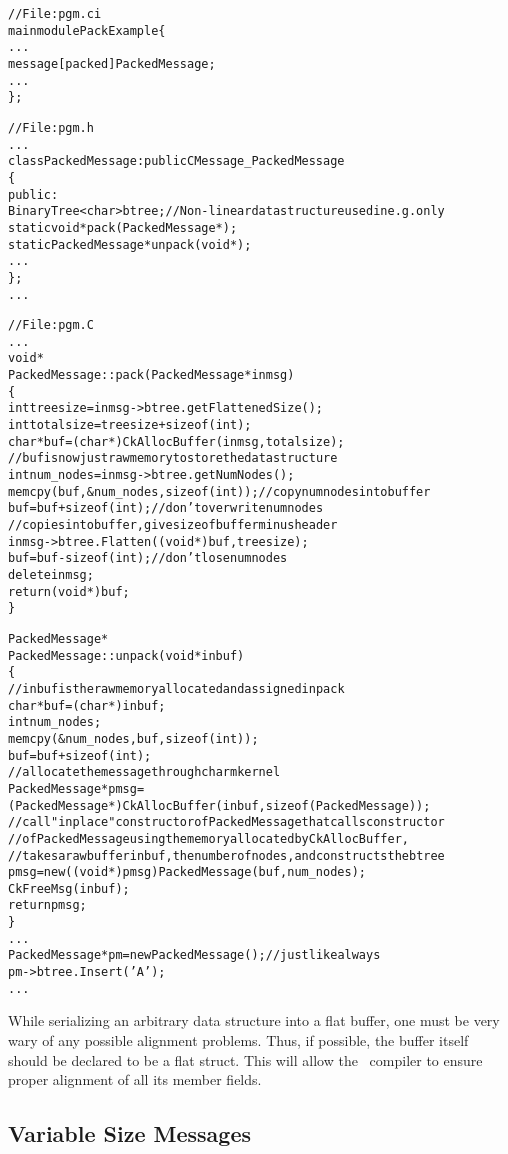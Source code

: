 \begin{alltt}
// File: pgm.ci
mainmodule PackExample \{
  ...
  message [packed] PackedMessage;
  ...
\};

// File: pgm.h
...
class PackedMessage : public CMessage_PackedMessage
\{
  public:
    BinaryTree<char> btree; // Non-linear data structure used in e.g. only 
    static void* pack(PackedMessage*);
    static PackedMessage* unpack(void*);
    ...
\};
...

// File: pgm.C
...
void*
PackedMessage::pack(PackedMessage* inmsg)
\{
  int treesize = inmsg->btree.getFlattenedSize();
  int totalsize = treesize + sizeof(int);
  char *buf = (char*)CkAllocBuffer(inmsg, totalsize);
  // buf is now just raw memory to store the data structure
  int num_nodes = inmsg->btree.getNumNodes();
  memcpy(buf, &num_nodes, sizeof(int));  // copy numnodes into buffer
  buf = buf + sizeof(int);               // don't overwrite numnodes
  // copies into buffer, give size of buffer minus header
  inmsg->btree.Flatten((void*)buf, treesize);    
  buf = buf - sizeof(int);              // don't lose numnodes
  delete inmsg;
  return (void*) buf;
\}

PackedMessage*
PackedMessage::unpack(void* inbuf)
\{
  // inbuf is the raw memory allocated and assigned in pack
  char* buf = (char*) inbuf;
  int num_nodes;
  memcpy(&num_nodes, buf, sizeof(int));
  buf = buf + sizeof(int);
  // allocate the message through charm kernel
  PackedMessage* pmsg = 
    (PackedMessage*)CkAllocBuffer(inbuf, sizeof(PackedMessage));
  // call "inplace" constructor of PackedMessage that calls constructor
  // of PackedMessage using the memory allocated by CkAllocBuffer,
  // takes a raw buffer inbuf, the number of nodes, and constructs the btree
  pmsg = new ((void*)pmsg) PackedMessage(buf, num_nodes);  
  CkFreeMsg(inbuf);
  return pmsg;
\}
... 
PackedMessage* pm = new PackedMessage();  // just like always 
pm->btree.Insert('A');
...
\end{alltt}


While serializing an arbitrary data structure into a flat buffer, one must be
very wary of any possible alignment problems.  Thus, if possible, the buffer
itself should be declared to be a flat struct.  This will allow the \CC\
compiler to ensure proper alignment of all its member fields.


\subsection{Variable Size Messages}
\label{varsize messages}

